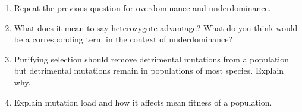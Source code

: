 \documentclass[letterpaper]{tufte-handout}
\begin{document}
\begin{enumerate}
	\item Repeat the previous question for overdominance and underdominance. 
	
	\item What does it mean to say heterozygote advantage? What do you think would be a corresponding term in the context of underdominance?
	
	\item Purifying selection should remove detrimental mutations from a population but detrimental mutations remain in populations of most species. Explain why.
	
	\item Explain mutation load and how it affects mean fitness of a population.


\end{enumerate}
\end{document}
